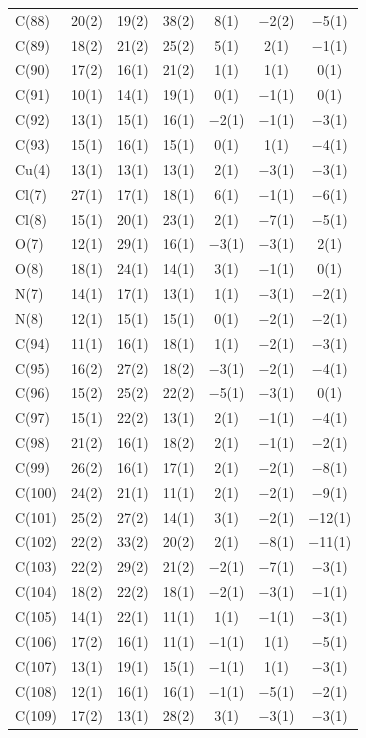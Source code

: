 \begin{center}
{\begin{supertabular}{lcccccc}
C(88)&20(2) &19(2)&38(2) &8(1)&$-$2(2) &$-$5(1)\\
C(89)&18(2) &21(2)&25(2) &5(1)&2(1) &$-$1(1)\\
C(90)&17(2) &16(1)&21(2) &1(1)&1(1) &0(1)\\
C(91)&10(1) &14(1)&19(1) &0(1)&$-$1(1) &0(1)\\
C(92)&13(1) &15(1)&16(1) &$-$2(1)&$-$1(1) &$-$3(1)\\
C(93)&15(1) &16(1)&15(1) &0(1)&1(1) &$-$4(1)\\
Cu(4)&13(1) &13(1)&13(1) &2(1)&$-$3(1) &$-$3(1)\\
Cl(7)&27(1) &17(1)&18(1) &6(1)&$-$1(1) &$-$6(1)\\
Cl(8)&15(1) &20(1)&23(1) &2(1)&$-$7(1) &$-$5(1)\\
O(7)&12(1) &29(1)&16(1) &$-$3(1)&$-$3(1) &2(1)\\
O(8)&18(1) &24(1)&14(1) &3(1)&$-$1(1) &0(1)\\
N(7)&14(1) &17(1)&13(1) &1(1)&$-$3(1) &$-$2(1)\\
N(8)&12(1) &15(1)&15(1) &0(1)&$-$2(1) &$-$2(1)\\
C(94)&11(1) &16(1)&18(1) &1(1)&$-$2(1) &$-$3(1)\\
C(95)&16(2) &27(2)&18(2) &$-$3(1)&$-$2(1) &$-$4(1)\\
C(96)&15(2) &25(2)&22(2) &$-$5(1)&$-$3(1) &0(1)\\
C(97)&15(1) &22(2)&13(1) &2(1)&$-$1(1) &$-$4(1)\\
C(98)&21(2) &16(1)&18(2) &2(1)&$-$1(1) &$-$2(1)\\
C(99)&26(2) &16(1)&17(1) &2(1)&$-$2(1) &$-$8(1)\\
C(100)&24(2) &21(1)&11(1) &2(1)&$-$2(1) &$-$9(1)\\
C(101)&25(2) &27(2)&14(1) &3(1)&$-$2(1) &$-$12(1)\\
C(102)&22(2) &33(2)&20(2) &2(1)&$-$8(1) &$-$11(1)\\
C(103)&22(2) &29(2)&21(2) &$-$2(1)&$-$7(1) &$-$3(1)\\
C(104)&18(2) &22(2)&18(1) &$-$2(1)&$-$3(1) &$-$1(1)\\
C(105)&14(1) &22(1)&11(1) &1(1)&$-$1(1) &$-$3(1)\\
C(106)&17(2) &16(1)&11(1) &$-$1(1)&1(1) &$-$5(1)\\
C(107)&13(1) &19(1)&15(1) &$-$1(1)&1(1) &$-$3(1)\\
C(108)&12(1) &16(1)&16(1) &$-$1(1)&$-$5(1) &$-$2(1)\\
C(109)&17(2) &13(1)&28(2) &3(1)&$-$3(1) &$-$3(1)\\

\end{supertabular}}
\end{center}
